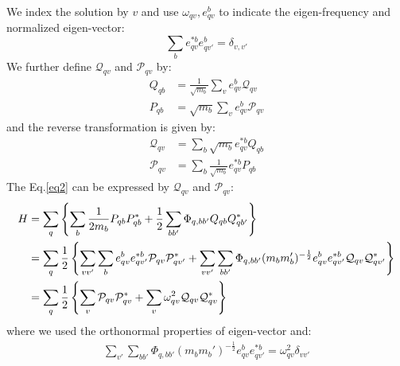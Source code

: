 \documentclass{article}
\begin{document}
We index the solution by $v$ and use $\omega_{qv}, e_{qv}^b$ to indicate the eigen-frequency and normalized eigen-vector:
\begin{equation}
    \sum_b e_{qv}^{*b} e_{qv'}^b = \delta_{v,v'}
\end{equation}
We further define $\mathcal{Q}_{qv}$ and $\mathcal{P}_{qv}$ by:
\begin{align}
    Q_{qb} &= \frac{1}{\sqrt{m_b}} \sum_v e_{qv}^b \mathcal{Q}_{qv} \\
    P_{qb} &= \sqrt{m_b} \sum_v e_{qv}^b \mathcal{P}_{qv}
\end{align}
and the reverse transformation is given by:
\begin{align}
    \mathcal{Q}_{qv} &= \sum_b \sqrt{m_b} e_{qv}^{*b} Q_{qb} \\
    \mathcal{P}_{qv} &= \sum_b \frac{1}{\sqrt{m_b}} e_{qv}^{*b} P_{qb}
\end{align}
The Eq.\ref{eq2} can be expressed by $\mathcal{Q}_{qv}$ and $\mathcal{P}_{qv}$:
\begin{align}
    H &= \sum_{q} \left\{ \sum_{b} \frac{1}{2m_b} P_{qb} P_{qb}^* + \frac{1}{2} \sum_{bb'} \Phi_{q,bb'} Q_{qb} Q_{qb'}^* \right\} \notag \\
      &= \sum_{q} \frac{1}{2} 
      \left\{ \sum_{vv'} \sum_{b}e_{qv}^b e_{qv'}^{*b} \mathcal{P}_{qv} \mathcal{P}^*_{qv'} + \sum_{vv'} \sum_{bb'} \Phi_{q,bb'} (m_b m_b')^{-\frac{1}{2}} e_{qv}^b e_{qv'}^{*b} \mathcal{Q}_{qv} \mathcal{Q}^*_{qv'}\right\} \notag \\
      &= \sum_{q} \frac{1}{2} 
      \left\{ \sum_{v} \mathcal{P}_{qv} \mathcal{P}^*_{qv} + \sum_{v} \omega^2_{qv} \mathcal{Q}_{qv} \mathcal{Q}^*_{qv}\right\} \label{hamil}
\end{align}
where we used the orthonormal properties of eigen-vector and:
\begin{align}
    \sum_{v'} \sum_{bb'} \Phi_{q,bb'} (m_b m_b')^{-\frac{1}{2}} e_{qv}^b e_{qv'}^{*b} = \omega^2_{qv}\delta_{vv'}
\end{align}
\end{document}
